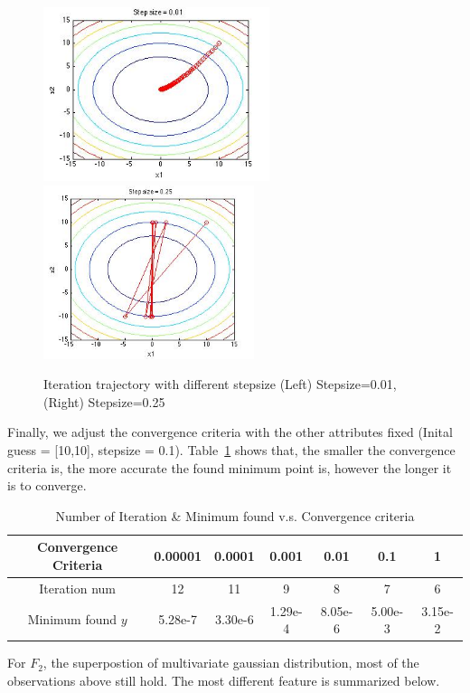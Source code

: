 \begin{figure}[h]
 \centering
\includegraphics[height=2in]{figures/p1_QualStepSmall} 
\includegraphics[height=2in]{figures/p1_QualStepBig} 
    \caption{Iteration trajectory with different stepsize (Left) Stepsize=0.01, (Right) Stepsize=0.25}
    \label{fig:ItrStep}
\end{figure}

Finally, we adjust the convergence criteria with the other attributes fixed (Inital guess = [10,10], stepsize = 0.1). Table~\ref{tab:ItrConve} shows that, the smaller the convergence criteria is, the more accurate the found minimum point is, however the longer it is to converge.
\begin{table}[h]
\centering
\caption{Number of Iteration \& Minimum found v.s. Convergence criteria} \label{tab:ItrConve} 
\begin{tabular}{ | c | c | c | c | c | c | c |  }
\hline 
Convergence Criteria & 0.00001 & 0.0001 & 0.001 & 0.01 & 0.1 & 1 \\
\hline 
Iteration num & 12 & 11 & 9 & 8 & 7 & 6  \\
\hline
Minimum found $y$ & 5.28e-7 & 3.30e-6 & 1.29e-4 & 8.05e-6 & 5.00e-3 & 3.15e-2\\
\hline
\end{tabular}
\end{table}


For $F_2$, the superpostion of multivariate gaussian distribution, most of the observations above still hold. The most different feature is summarized below.

